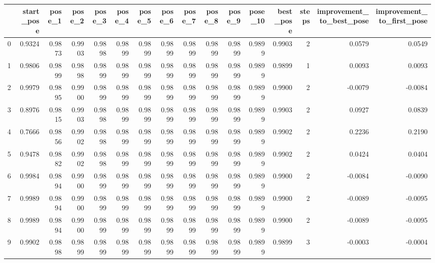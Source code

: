 \begin{tabular}{lrrrrrrrrrrrrrrr}
\toprule
{} &  start\_pose &  pose\_1 &  pose\_2 &  pose\_3 &  pose\_4 &  pose\_5 &  pose\_6 &  pose\_7 &  pose\_8 &  pose\_9 &  pose\_10 &  best\_pose &  steps &  improvement\_to\_best\_pose &  improvement\_to\_first\_pose \\
\midrule
0 &      0.9324 &  0.9873 &  0.9903 &  0.9898 &  0.9899 &  0.9899 &  0.9899 &  0.9899 &  0.9899 &  0.9899 &   0.9899 &     0.9903 &      2 &                    0.0579 &                     0.0549 \\
1 &      0.9806 &  0.9899 &  0.9898 &  0.9899 &  0.9899 &  0.9899 &  0.9899 &  0.9899 &  0.9899 &  0.9899 &   0.9899 &     0.9899 &      1 &                    0.0093 &                     0.0093 \\
2 &      0.9979 &  0.9895 &  0.9900 &  0.9899 &  0.9899 &  0.9899 &  0.9899 &  0.9899 &  0.9899 &  0.9899 &   0.9899 &     0.9900 &      2 &                   -0.0079 &                    -0.0084 \\
3 &      0.8976 &  0.9815 &  0.9903 &  0.9898 &  0.9899 &  0.9899 &  0.9899 &  0.9899 &  0.9899 &  0.9899 &   0.9899 &     0.9903 &      2 &                    0.0927 &                     0.0839 \\
4 &      0.7666 &  0.9856 &  0.9902 &  0.9898 &  0.9899 &  0.9899 &  0.9899 &  0.9899 &  0.9899 &  0.9899 &   0.9899 &     0.9902 &      2 &                    0.2236 &                     0.2190 \\
5 &      0.9478 &  0.9882 &  0.9902 &  0.9898 &  0.9899 &  0.9899 &  0.9899 &  0.9899 &  0.9899 &  0.9899 &   0.9899 &     0.9902 &      2 &                    0.0424 &                     0.0404 \\
6 &      0.9984 &  0.9894 &  0.9900 &  0.9899 &  0.9899 &  0.9899 &  0.9899 &  0.9899 &  0.9899 &  0.9899 &   0.9899 &     0.9900 &      2 &                   -0.0084 &                    -0.0090 \\
7 &      0.9989 &  0.9894 &  0.9900 &  0.9899 &  0.9899 &  0.9899 &  0.9899 &  0.9899 &  0.9899 &  0.9899 &   0.9899 &     0.9900 &      2 &                   -0.0089 &                    -0.0095 \\
8 &      0.9989 &  0.9894 &  0.9900 &  0.9899 &  0.9899 &  0.9899 &  0.9899 &  0.9899 &  0.9899 &  0.9899 &   0.9899 &     0.9900 &      2 &                   -0.0089 &                    -0.0095 \\
9 &      0.9902 &  0.9898 &  0.9899 &  0.9899 &  0.9899 &  0.9899 &  0.9899 &  0.9899 &  0.9899 &  0.9899 &   0.9899 &     0.9899 &      3 &                   -0.0003 &                    -0.0004 \\
\bottomrule
\end{tabular}
